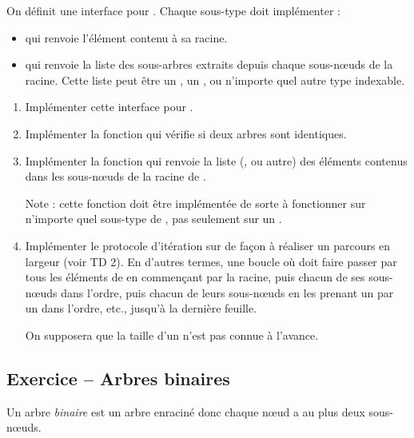\documentclass{article}
\newcounter{loop}
\newcounter{numEx}
\newcommand{\exo}[1]{
	\stepcounter{numEx}
	\setcounter{loop}{0}
	\subsection*{Exercice \arabic{numEx} -- #1}
}
\begin{document}
\noindent On définit une interface pour . Chaque sous-type doit implémenter :
\begin{itemize}
	\item {} qui renvoie l'élément contenu à sa racine.
	\item {} qui renvoie la liste des sous-arbres extraits depuis chaque sous-nœuds de la racine. Cette liste peut être un , un , ou n'importe quel autre type indexable.
\end{itemize}

\begin{enumerate}[resume]
	\item Implémenter cette interface pour .
	
	\item Implémenter la fonction  qui vérifie si deux arbres sont identiques.
	
	\item Implémenter la fonction  qui renvoie la liste (,  ou autre) des éléments contenus dans les sous-nœuds de la racine de .
	
	Note : cette fonction doit être implémentée de sorte à fonctionner sur n'importe quel sous-type de , pas seulement sur un .
	
	\item Implémenter le protocole d'itération sur  de façon à réaliser un parcours en largeur (voir TD 2). En d'autres termes, une boucle  où  doit faire passer  par tous les éléments de  en commençant par la racine, puis chacun de ses sous-nœuds dans l'ordre, puis chacun de leurs sous-nœuds en les prenant un par un dans l'ordre, etc., jusqu'à la dernière feuille.
	
	On supposera que la taille d'un  n'est pas connue à l'avance.
\end{enumerate}

\exo{Arbres binaires}

Un arbre \emph{binaire} est un arbre enraciné donc chaque nœud a au plus deux sous-nœuds.
\end{document}
